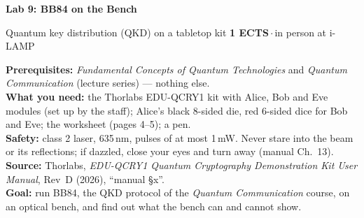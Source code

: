 \documentclass[a4paper,11pt]{article}
\begin{document}
{\LARGE\bfseries\color{ibmblue} Lab 9: BB84 on the Bench}\par
\vspace{2pt}
{\large Quantum key distribution (QKD) on a tabletop kit}\hfill
\textbf{1 ECTS}\,$\cdot$\,in person at i-LAMP\par
\vspace{4pt}
\textbf{Prerequisites:} \textit{Fundamental Concepts of Quantum Technologies} and
\textit{Quantum Communication} (lecture series) --- nothing else.\\
\textbf{What you need:} the Thorlabs EDU-QCRY1 kit with Alice, Bob and Eve modules
(set up by the staff); Alice's black 8-sided die, red 6-sided dice for Bob and Eve; the
worksheet (pages 4--5); a pen.\\
\textbf{Safety:} class 2 laser, 635\,nm, pulses of at most 1\,mW. Never stare into the
beam or its reflections; if dazzled, close your eyes and turn away (manual Ch.~13).\\
{\footnotesize\textbf{Source:} Thorlabs, \textit{EDU-QCRY1 Quantum Cryptography Demonstration Kit User
Manual}, Rev~D (2026), ``manual \S x''.}\\
\textbf{Goal:} run BB84, the QKD protocol of the \textit{Quantum Communication} course, on
an optical bench, and find out what the bench can and cannot show.

\begin{center}
\end{center}
\end{document}
